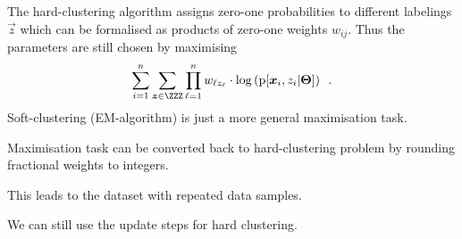 \documentclass[landscape,footrule]{foils}
\newcommand{\pd}[1]{\mathrm{p}[#1]}
\begin{document}

The hard-clustering algorithm assigns zero-one probabilities to different labelings $\vec{z}$ which can be formalised as products of zero-one weights $w_{ij}$. Thus the parameters are still chosen by maximising
\begin{align*}
\sum_{i=1}^n \sum_{\vec{z}\in\ZZZ}\prod_{\ell=1}^n w_{\ell z_\ell}\cdot\log\left(\pd{\vec{x}_i,z_i|\vec{\Theta}}\right)
\enspace.
\end{align*}
Soft-clustering (EM-algorithm) is just a more general maximisation task.

Maximisation task can be converted back to hard-clustering problem by rounding fractional weights to integers.
\begin{triangles}
\item This leads to the dataset with repeated data samples. 
\item We can still use the update steps for hard clustering.
\end{triangles}
\end{document}
